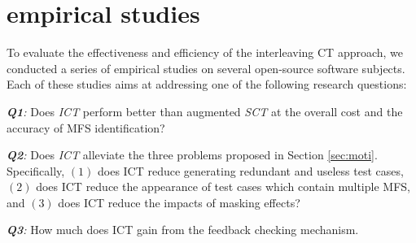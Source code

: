 \documentclass[journal,12pt,onecolumn,draftclsnofoot,]{IEEEtran}
\begin{document}
%
%

\section{empirical studies}\label{sec:emprical}
To evaluate the effectiveness and efficiency of the interleaving CT approach, we conducted a series of empirical studies on several open-source software subjects. Each of these studies aims at addressing one of the following research questions:

\emph{\textbf{Q1}:} Does \emph{ICT}  perform better than augmented \emph{SCT} at the overall cost and the accuracy of MFS identification?

\emph{\textbf{Q2}:} Does \emph{ICT} alleviate the three problems proposed in Section \ref{sec:moti}. Specifically, $(1)$ does ICT reduce generating redundant and useless test cases, $(2)$ does ICT reduce the appearance of test cases which contain multiple MFS,  and $(3)$ does ICT reduce the impacts of masking effects?

\emph{\textbf{Q3}:} How much does ICT gain from the feedback checking mechanism.
\end{document}
